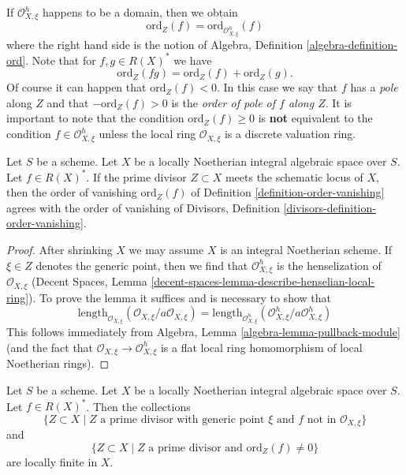 \noindent
If $\mathcal{O}_{X, \xi}^h$ happens to be a domain, then we obtain
$$
\text{ord}_Z(f) = \text{ord}_{\mathcal{O}_{X, \xi}^h}(f)
$$
where the right hand side is the notion of
Algebra, Definition \ref{algebra-definition-ord}.
Note that for $f, g \in R(X)^*$ we have
$$
\text{ord}_Z(fg) = \text{ord}_Z(f) + \text{ord}_Z(g).
$$
Of course it can happen that $\text{ord}_Z(f) < 0$.
In this case we say that $f$ has a {\it pole} along $Z$
and that $-\text{ord}_Z(f) > 0$ is the
{\it order of pole of $f$ along $Z$}. It is important to note
that the condition $\text{ord}_Z(f) \geq 0$ is {\bf not} equivalent
to the condition $f \in \mathcal{O}_{X, \xi}^h$ unless the local
ring $\mathcal{O}_{X, \xi}$ is a discrete valuation ring.

\begin{lemma}
\label{lemma-order-vanishing-agrees}
Let $S$ be a scheme. Let $X$ be a locally Noetherian integral algebraic
space over $S$. Let $f \in R(X)^*$. If the prime divisor
$Z \subset X$ meets the schematic locus of $X$, then the order
of vanishing $\text{ord}_Z(f)$ of Definition \ref{definition-order-vanishing}
agrees with the order of vanishing of
Divisors, Definition \ref{divisors-definition-order-vanishing}.
\end{lemma}

\begin{proof}
After shrinking $X$ we may assume $X$ is an integral Noetherian scheme.
If $\xi \in Z$ denotes the generic point, then we find that
$\mathcal{O}_{X, \xi}^h$ is the henselization of $\mathcal{O}_{X, \xi}$
(Decent Spaces, Lemma \ref{decent-spaces-lemma-describe-henselian-local-ring}).
To prove the lemma it suffices and is necessary to show that
$$
\text{length}_{\mathcal{O}_{X, \xi}}
(\mathcal{O}_{X, \xi}/a \mathcal{O}_{X, \xi}) =
\text{length}_{\mathcal{O}_{X, \xi}^h}
(\mathcal{O}_{X, \xi}^h/a \mathcal{O}_{X, \xi}^h)
$$
This follows immediately from
Algebra, Lemma \ref{algebra-lemma-pullback-module}
(and the fact that $\mathcal{O}_{X, \xi} \to \mathcal{O}_{X, \xi}^h$
is a flat local ring homomorphism of local Noetherian rings).
\end{proof}

\begin{lemma}
\label{lemma-divisor-locally-finite}
Let $S$ be a scheme. Let $X$ be a locally Noetherian integral algebraic space
over $S$. Let $f \in R(X)^*$. Then the collections
$$
\{Z \subset X \mid Z\text{ a prime divisor with generic point }\xi
\text{ and }f\text{ not in }\mathcal{O}_{X, \xi}\}
$$
and
$$
\{Z \subset X \mid Z \text{ a prime divisor and }\text{ord}_Z(f) \not = 0\}
$$
are locally finite in $X$.
\end{lemma}

